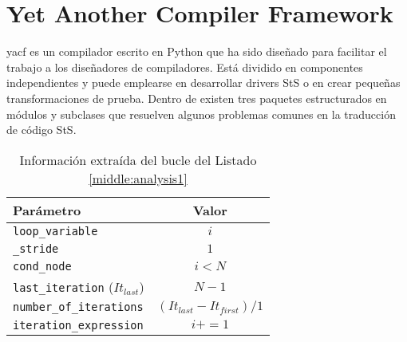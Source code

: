 %
%
%
%

\cleardoublepage

\chapter{Yet Another Compiler Framework}
\label{chap:yacf}  

% 

\noindent
\acf{yacf} es un compilador \sts{} escrito en Python que ha sido diseñado para facilitar 
el trabajo a los diseñadores de compiladores.
Está dividido en componentes independientes y puede emplearse en desarrollar drivers
\ac{StS} o en crear pequeñas transformaciones de prueba.
Dentro de \yacf{} existen tres paquetes estructurados en módulos y subclases que
resuelven algunos problemas comunes en la traducción de código \ac{StS}.


\begin{table}[htpb]
\centering
\begin{tabular}{ | l | c | }
  \hline
  \textbf{Parámetro} & \textbf{Valor}                        \\ \hline
  \texttt{loop\_variable} & $i$                                        \\ \hline
  \texttt{\_stride} & $1$                                               \\ \hline
  \texttt{cond\_node} & $i < N$                               \\ \hline
  \texttt{last\_iteration} ($It_{last}$) &  $N-1$  \\   \hline
  \texttt{number\_of\_iterations} & $ ( It_{last} - It_{first} ) / 1 $  \\ \hline
  \texttt{iteration\_expression} & $i += 1$                                        \\  \hline
\end{tabular}
\caption{Información extraída del bucle del Listado \ref{middle:analysis1}}
\label{middle:analysis2}
\end{table}

